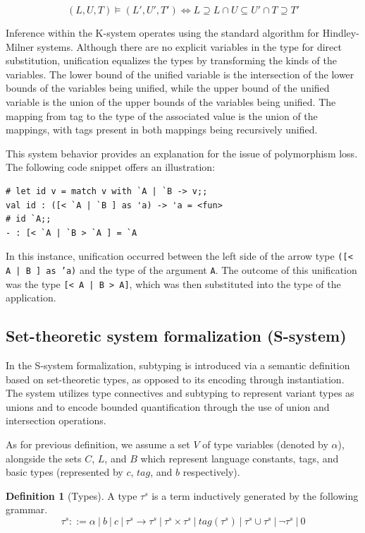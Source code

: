 \documentclass[a4paper,11pt,oneside]{article}
\theoremstyle{definition}
\newtheorem{defsec}{Definition}[section]
\begin{document}
$$ (L, U, T ) \vDash (L', U ', T ') \Leftrightarrow L \supseteq L \cap U \subseteq U' \cap T \supseteq T'  $$

Inference within the K-system operates using the standard algorithm for Hindley-Milner systems. Although there are no explicit variables in the type for direct substitution, unification equalizes the types by transforming the kinds of the variables. The lower bound of the unified variable is the intersection of the lower bounds of the variables being unified, while the upper bound of the unified variable is the union of the upper bounds of the variables being unified. The mapping from tag to the type of the associated value is the union of the mappings, with tags present in both mappings being recursively unified.

This system behavior provides an explanation for the issue of polymorphism loss. The following code snippet offers an illustration:

{\ttfamily\begin{verbatim}
# let id v = match v with `A | `B -> v;;
val id : ([< `A | `B ] as 'a) -> 'a = <fun>
# id `A;;
- : [< `A | `B > `A ] = `A
\end{verbatim}}

In this instance, unification occurred between the left side of the arrow type \texttt{([< A | B ] as 'a)} and the type of the argument \texttt{A}. The outcome of this unification was the type \texttt{[< A | B > A]}, which was then substituted into the type of the application.

\subsection{Set-theoretic system formalization (S-system)}

In the S-system formalization, subtyping is introduced via a semantic definition based on set-theoretic types, as opposed to its encoding through instantiation. The system utilizes type connectives and subtyping to represent variant types as unions and to encode bounded quantification through the use of union and intersection operations.

As for previous definition, we assume a set $V$ of type variables (denoted by $\alpha$), alongside the sets $C$, $L$, and $B$ which represent language constants, tags, and basic types (represented by $c$, $tag$, and $b$ respectively).

\begin{defsec}[Types]
  A type $\tau^s$ is a term inductively generated by the following grammar.
  $$ \tau^s ::= \alpha\ |\ b\ |\ c\ |\ \tau^s \rightarrow \tau^s\ |\ \tau^s \times \tau^s\ |\ tag(\tau^s)\ |\ \tau^s \cup \tau^s\ |\ \neg\tau^s\ |\ 0 $$
\end{defsec}
\end{document}
